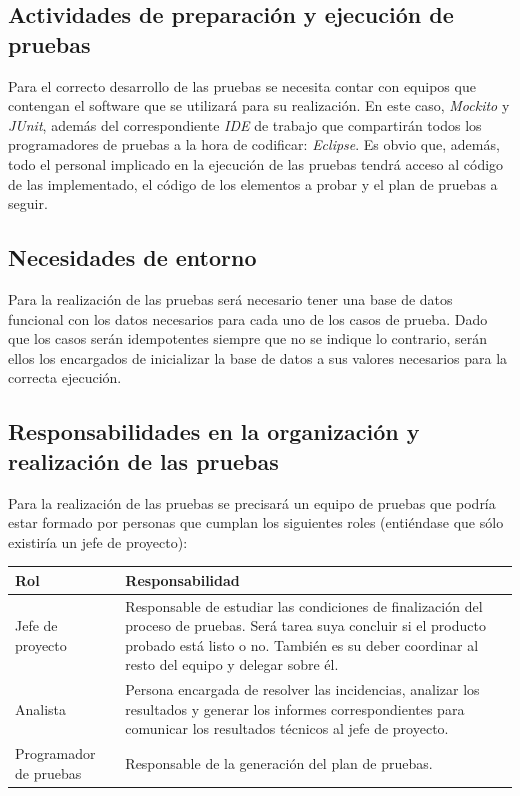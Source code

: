 \documentclass[10pt,a4paper]{article}
\begin{document}
	\subsection{Actividades de preparación y ejecución de pruebas}
		Para el correcto desarrollo de las pruebas se necesita contar con equipos que contengan el software que se utilizará para su realización. En este caso, \emph{Mockito} y \emph{JUnit}, además del correspondiente \emph{IDE} de trabajo que compartirán todos los programadores de pruebas a la hora de codificar: \emph{Eclipse}. Es obvio que, además, todo el personal implicado en la ejecución de las pruebas tendrá acceso al código de las implementado, el código de los elementos a probar y el plan de pruebas a seguir.

	\subsection{Necesidades de entorno}
		Para la realización de las pruebas será necesario tener una base de datos funcional con los datos necesarios para cada uno de los casos de prueba. Dado que los casos serán idempotentes siempre que no se indique lo contrario, serán ellos los encargados de inicializar la base de datos a sus valores necesarios para la correcta ejecución.

	\subsection{Responsabilidades en la organización y realización de las pruebas}
		Para la realización de las pruebas se precisará un equipo de pruebas que podría estar formado por personas que cumplan los siguientes roles (entiéndase que sólo existiría un jefe de proyecto):
		
		\begin{table}[]
\centering
\begin{tabularx}{\textwidth}{|l|X|}
\hline
\textbf{Rol}           & \textbf{Responsabilidad}                                                                                                                                                                                               \\ \hline
Jefe de proyecto       & Responsable de estudiar las condiciones de finalización del proceso de pruebas. Será tarea suya concluir si el producto probado está listo o no. También es su deber coordinar al resto del equipo y delegar sobre él. \\ \hline
Analista               & Persona encargada de resolver las incidencias, analizar los resultados y generar los informes correspondientes para comunicar los resultados técnicos al jefe de proyecto.                                             \\ \hline
Programador de pruebas & Responsable de la generación del plan de pruebas.                                                                                                                                                                      \\ \hline
\end{tabularx}
\end{table}
\end{document}
